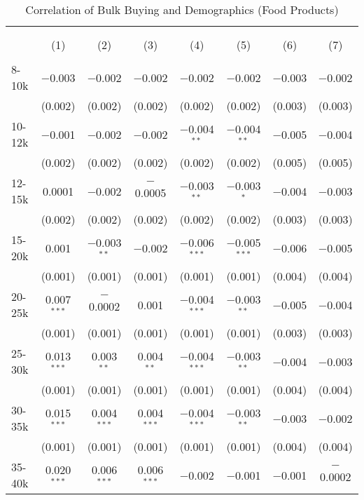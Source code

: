 
\begin{table}[!htbp] \centering 
  \caption{Correlation of Bulk Buying and Demographics (Food Products)} 
  \label{tab:discountingBehaviorFood} 
\begin{tabular}{@{\extracolsep{5pt}}lccccccc} 
\\[-1.8ex]\hline 
\hline \\[-1.8ex] 
\\[-1.8ex] & (1) & (2) & (3) & (4) & (5) & (6) & (7)\\ 
\hline \\[-1.8ex] 
 8-10k & $-$0.003 & $-$0.002 & $-$0.002 & $-$0.002 & $-$0.002 & $-$0.003 & $-$0.002 \\ 
  & (0.002) & (0.002) & (0.002) & (0.002) & (0.002) & (0.003) & (0.003) \\ 
  10-12k & $-$0.001 & $-$0.002 & $-$0.002 & $-$0.004$^{**}$ & $-$0.004$^{**}$ & $-$0.005 & $-$0.004 \\ 
  & (0.002) & (0.002) & (0.002) & (0.002) & (0.002) & (0.005) & (0.005) \\ 
  12-15k & 0.0001 & $-$0.002 & $-$0.0005 & $-$0.003$^{**}$ & $-$0.003$^{*}$ & $-$0.004 & $-$0.003 \\ 
  & (0.002) & (0.002) & (0.002) & (0.002) & (0.002) & (0.003) & (0.003) \\ 
  15-20k & 0.001 & $-$0.003$^{**}$ & $-$0.002 & $-$0.006$^{***}$ & $-$0.005$^{***}$ & $-$0.006 & $-$0.005 \\ 
  & (0.001) & (0.001) & (0.001) & (0.001) & (0.001) & (0.004) & (0.004) \\ 
  20-25k & 0.007$^{***}$ & $-$0.0002 & 0.001 & $-$0.004$^{***}$ & $-$0.003$^{**}$ & $-$0.005 & $-$0.004 \\ 
  & (0.001) & (0.001) & (0.001) & (0.001) & (0.001) & (0.003) & (0.003) \\ 
  25-30k & 0.013$^{***}$ & 0.003$^{**}$ & 0.004$^{**}$ & $-$0.004$^{***}$ & $-$0.003$^{**}$ & $-$0.004 & $-$0.003 \\ 
  & (0.001) & (0.001) & (0.001) & (0.001) & (0.001) & (0.004) & (0.004) \\ 
  30-35k & 0.015$^{***}$ & 0.004$^{***}$ & 0.004$^{***}$ & $-$0.004$^{***}$ & $-$0.003$^{**}$ & $-$0.003 & $-$0.002 \\ 
  & (0.001) & (0.001) & (0.001) & (0.001) & (0.001) & (0.004) & (0.004) \\ 
  35-40k & 0.020$^{***}$ & 0.006$^{***}$ & 0.006$^{***}$ & $-$0.002 & $-$0.001 & $-$0.001 & $-$0.0002 \\ 

\end{tabular}
\end{table}
